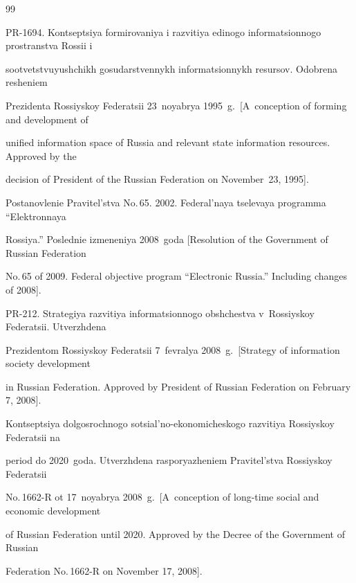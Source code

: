 {\small\frenchspacing

{%


\begin{thebibliography}{99}


PR-1694. Kontseptsiya formirovaniya i razvitiya edinogo informatsionnogo prostranstva Rossii i

sootvetstvuyushchikh gosudarstvennykh informatsionnykh resursov. Odobrena resheniem

Prezidenta Rossiyskoy Federatsii 23~noyabrya 1995~g.\ [A~conception of forming and development of

unified information space of Russia and relevant state information resources. Approved by the

decision of President of the Russian Federation on November~23, 1995].


Postanovlenie Pravitel'stva No.\,65. 2002. Federal'naya tselevaya programma ``Elektronnaya

Rossiya.'' Poslednie izmeneniya 2008~goda [Resolution of the Government of Russian Federation

No.\,65 of 2009. Federal objective program ``Electronic Russia.'' Including changes of 2008].


PR-212. Strategiya razvitiya informatsionnogo obshchestva v~Rossiyskoy Federatsii. Utverzhdena

Prezidentom Rossiyskoy Federatsii 7~fevralya 2008~g.\ [Strategy of information society development

in Russian Federation. Approved by President of Russian Federation on February 7, 2008].


Kontseptsiya dolgosrochnogo sotsial'no-ekonomicheskogo razvitiya Rossiyskoy Federatsii na

period do 2020~goda. Utverzhdena rasporyazheniem Pravitel'stva Rossiyskoy Federatsii

No.\,1662-R ot 17~noyabrya 2008~g.\ [A~conception of long-time social and economic development

of Russian Federation until 2020. Approved by the Decree of the Government of Russian

Federation No.\,1662-R on November 17, 2008].




\end{thebibliography}}}
